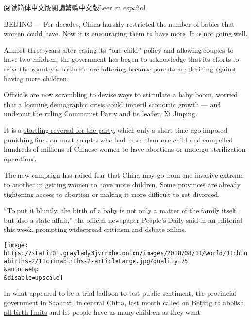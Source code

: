 \href{https://cn.nytimes3xbfgragh.onion/china/20180813/china-one-child-policy-birthrate/}{阅读简体中文版}\href{https://cn.nytimes3xbfgragh.onion/china/20180813/china-one-child-policy-birthrate/zh-hant/}{閱讀繁體中文版}\href{https://www.nytimes3xbfgragh.onion/es/2018/08/16/china-poblacion-hijo-unico/}{Leer
en español}

BEIJING --- For decades, China harshly restricted the number of babies
that women could have. Now it is encouraging them to have more. It is
not going well.

Almost three years after
\href{https://www.nytimes3xbfgragh.onion/2015/10/30/world/asia/china-end-one-child-policy.html}{easing
its ``one child'' policy} and allowing couples to have two children, the
government has begun to acknowledge that its efforts to raise the
country's birthrate are faltering because parents are deciding against
having more children.

Officials are now scrambling to devise ways to stimulate a baby boom,
worried that a looming demographic crisis could imperil economic growth
--- and undercut the ruling Communist Party and its leader,
\href{https://www.nytimes3xbfgragh.onion/2018/07/31/world/asia/xi-jinping-internal-dissent.html}{Xi
Jinping}.

It is a
\href{https://www.nytimes3xbfgragh.onion/interactive/2015/10/29/world/asia/china-one-child-policy-timeline.html}{startling
reversal for the party}, which only a short time ago imposed punishing
fines on most couples who had more than one child and compelled hundreds
of millions of Chinese women to have abortions or undergo sterilization
operations.

The new campaign has raised fear that China may go from one invasive
extreme to another in getting women to have more children. Some
provinces are already tightening access to abortion or making it more
difficult to get divorced.

``To put it bluntly, the birth of a baby is not only a matter of the
family itself, but also a state affair,'' the official newspaper
People's Daily said in an editorial this week, prompting widespread
criticism and debate online.

\texttt{[image: https://static01.graylady3jvrrxbe.onion/images/2018/08/11/world/11chinabirths-2/11chinabirths-2-articleLarge.jpg?quality=75\\\&auto=webp\\\&disable=upscale]}

In what appeared to be a trial balloon to test public sentiment, the
provincial government in Shaanxi, in central China, last month called on
Beijing \href{http://www.globaltimes.cn/content/1111866.shtml}{to
abolish all birth limits} and let people have as many children as they
want.

